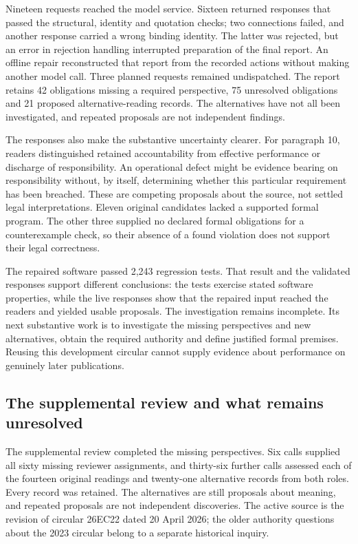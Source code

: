 Nineteen requests reached the model service. Sixteen returned responses that
passed the structural, identity and quotation checks; two connections failed,
and another response carried a wrong binding identity. The latter was rejected,
but an error in rejection handling interrupted preparation of the final report.
An offline repair reconstructed that report from the recorded actions without
making another model call. Three planned requests remained undispatched.
The report retains 42 obligations missing a required perspective, 75 unresolved
obligations and 21 proposed alternative-reading records. The alternatives have
not all been investigated, and repeated proposals are not independent findings.

The responses also make the substantive uncertainty clearer. For paragraph 10,
readers distinguished retained accountability from effective performance or
discharge of responsibility. An operational defect might be evidence bearing
on responsibility without, by itself, determining whether this particular
requirement has been breached. These are competing proposals about the source,
not settled legal interpretations. Eleven original candidates lacked a
supported formal program. The other three supplied no declared formal
obligations for a counterexample check, so their absence of a found violation
does not support their legal correctness.

The repaired software passed 2,243 regression tests. That result and the
validated responses support different conclusions: the tests exercise stated
software properties, while the live responses show that the repaired input
reached the readers and yielded usable proposals. The investigation remains
incomplete. Its next substantive work is to investigate the missing perspectives
and new alternatives, obtain the required authority and define justified formal
premises. Reusing this development circular cannot supply evidence about
performance on genuinely later publications.

\subsection{The supplemental review and what remains unresolved}

The supplemental review completed the missing perspectives. Six calls supplied
all sixty missing reviewer assignments, and thirty-six further calls assessed
each of the fourteen original readings and twenty-one alternative records from
both roles. Every record was retained. The alternatives are still proposals
about meaning, and repeated proposals are not independent discoveries. The
active source is the revision of circular 26EC22 dated 20 April 2026; the older
authority questions about the 2023 circular belong to a separate historical
inquiry.

